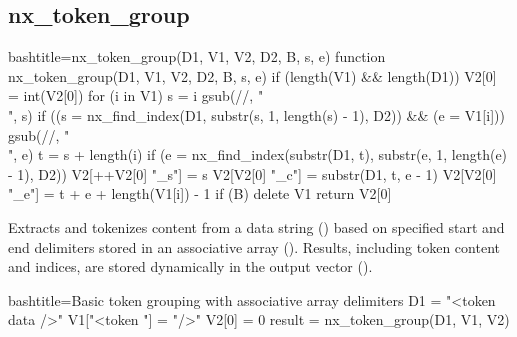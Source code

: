 \newpage
\subsection{nx_token_group}
\label{nx_token_group}
\begin{NexCodeBox}{bash}{title={nx_token_group(D1, V1, V2, D2, B, s, e)}}
function nx_token_group(D1, V1, V2, D2, B, s, e) {
	if (length(V1) && length(D1)) {
	V2[0] = int(V2[0])
	for (i in V1) {
		s = i
		gsub(//, "\\", s)
		if ((s = nx_find_index(D1, substr(s, 1, length(s) - 1), D2)) && (e = V1[i])) {
		gsub(//, "\\", e)
		t = s + length(i)
		if (e = nx_find_index(substr(D1, t), substr(e, 1, length(e) - 1), D2)) {
			V2[++V2[0] "_s"] = s
			V2[V2[0] "_c"] = substr(D1, t, e - 1)
			V2[V2[0] "_e"] = t + e + length(V1[i]) - 1
		}
		}
	}
	if (B)
		delete V1
	return V2[0]
	}
}
\end{NexCodeBox}

\begin{NexMainBox}
	\begin{NexMainBox}
	Extracts and tokenizes content from a data string () based on specified start and end delimiters stored in an associative array (). Results, including token content and indices, are stored dynamically in the output vector ().
	\end{NexMainBox}
	\begin{NexMainBox}
	\begin{NexListDark}
	\end{NexListDark}
	\end{NexMainBox}
\end{NexMainBox}

\begin{NexCodeBox}{bash}{title={Basic token grouping with associative array delimiters}}
	D1 = "<token data />"
	V1["<token "] = "/>"
	V2[0] = 0
	result = nx_token_group(D1, V1, V2)
\end{NexCodeBox}

